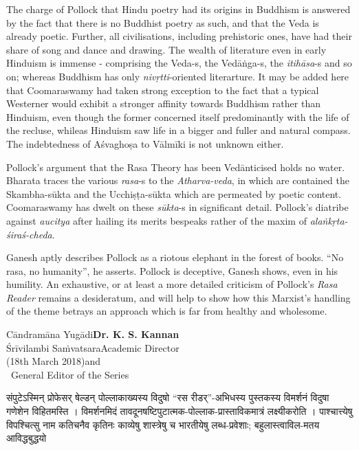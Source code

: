 \newpage

The charge of Pollock that Hindu poetry had its origins in Buddhism is answered by the fact that there is no Buddhist poetry as such, and that the Veda is already poetic. Further, all civilisations, including prehistoric ones, have had their share of song and dance and drawing. The wealth of literature even in early Hinduism is immense - comprising the Veda-s, the Vedāṅga-s, the \textsl{itihāsa}-s and so on; whereas Buddhism has only \textsl{nivṛtti}-oriented literarture. It may be added here that Coomaraswamy had taken strong exception to the fact that a typical Westerner would exhibit a stronger affinity towards Buddhism rather than Hinduism, even though the former concerned itself predominantly with the life of the recluse, whileas Hinduism saw life in a bigger and fuller and natural compass. The indebtedness of Aśvaghoṣa to Vālmīki is not unknown either.

Pollock’s argument that the Rasa Theory has been Vedānticised holds no water. Bharata traces the various \textsl{rasa}-s to the \textsl{Atharva-veda}, in which are contained the Skambha-sūkta and the Ucchiṣṭa-sūkta which are permeated by poetic content. Coomaraswamy has dwelt on these \textsl{sūkta}-s in significant detail. Pollock’s diatribe against \textsl{aucitya} after hailing its merits bespeaks rather of the maxim of \textsl{alaṅkṛta-śiraś-cheda}.

Ganesh aptly describes Pollock as a riotous elephant in the forest of books. “No rasa, no humanity”, he asserts. Pollock is deceptive, Ganesh shows, even in his humility. An exhaustive, or at least a more detailed criticism of Pollock’s \textsl{Rasa Reader} remains a desideratum, and will help to show how this Marxist’s handling of the theme betrays an approach which is far from healthy and wholesome.

\bigskip
\noindent
Cāndramāna Yugādi\hfill {\bf Dr. K. S. Kannan}\\
Śrīvilambi Saṁvatsara\hfill Academic Director\\
(18th March 2018)\hfill	and\\
~\phantom{a}\hfill  General Editor of the Series

\newpage

{\dev संपुटेऽस्मिन् प्रोफेसर् षेल्डन् पोल्लाकाख्यस्य विदुषो “रस रीडर्”-अभिधस्य पुस्तकस्य विमर्शनं विदुषा गणेशेन विहितमस्ति । विमर्शनमिदं  तावदूनषष्टिपुटात्मक-पोल्लाक-प्रास्ताविकमात्रं लक्ष्यीकरोति । पाश्चात्त्येषु विपश्चित्सु नाम कतिचनैव कृतिनः काव्येषु शास्त्रेषु च भारतीयेषु लब्ध-प्रवेशाः; बहुलास्त्वाविल-मतय आविद्धबुद्धयो}

